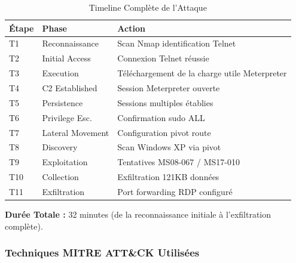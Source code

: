 \documentclass[12pt,a4paper,openany]{report}
\newcommand{\tableheadcolor}{\rowcolor{tableheadbg}}
\begin{document}
	\begin{table}[H]
		\centering
		\small
		\renewcommand{\arraystretch}{1.3}
		\setlength{\arrayrulewidth}{0.5pt}
		\begin{tabular}{>{\centering\arraybackslash}p{2.5cm} p{4cm} p{6cm}}
			\arrayrulecolor{tableborder}
			\hline
			\tableheadcolor
			\textcolor{tableheadfg}{\textbf{Étape}} &
			\textcolor{tableheadfg}{\textbf{Phase}} &
			\textcolor{tableheadfg}{\textbf{Action}} \\
			\hline
			\rowcolor{tablerowalt}
			T1 & Reconnaissance & Scan Nmap identification Telnet \\
			T2 & Initial Access & Connexion Telnet réussie \\
			\rowcolor{tablerowalt}
			T3 & Execution & Téléchargement de la charge utile Meterpreter \\
			T4 & C2 Established & Session Meterpreter ouverte \\
			\rowcolor{tablerowalt}
			T5 & Persistence & Sessions multiples établies \\
			T6 & Privilege Esc. & Confirmation sudo ALL \\
			\rowcolor{tablerowalt}
			T7 & Lateral Movement & Configuration pivot route \\
			T8 & Discovery & Scan Windows XP via pivot \\
			\rowcolor{tablerowalt}
			T9 & Exploitation & Tentatives MS08-067 / MS17-010 \\
			T10 & Collection & Exfiltration 121KB données \\
			\rowcolor{tablerowalt}
			T11 & Exfiltration & Port forwarding RDP configuré \\
			\hline
		\end{tabular}
		\caption{Timeline Complète de l'Attaque}
		\label{tab:attack-timeline}
	\end{table}
	
	\textbf{Durée Totale :} 32 minutes (de la reconnaissance initiale à l'exfiltration complète).
	
	\subsubsection{Techniques MITRE ATT\&CK Utilisées}
	
\end{document}
